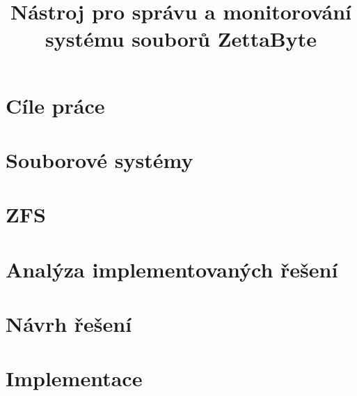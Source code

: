 \documentclass[thesis=B,czech]{FITthesis}[2012/06/26]
\title{Nástroj pro správu a monitorování systému souborů ZettaByte}
\begin{document}

\begin{introduction}
    
\end{introduction}

\chapter{Cíle práce}
    

\chapter{Souborové systémy}
    

\chapter{ZFS}
    

\chapter{Analýza implementovaných řešení}
    

\chapter{Návrh řešení}
    
\chapter{Implementace}
    
\begin{conclusion}
	
\end{conclusion}




\appendix
\end{document}
